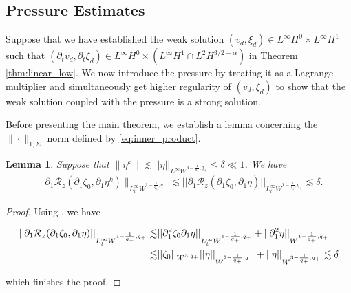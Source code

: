 \documentclass[letterpaper,reqno,10pt,twoside]{amsart}
\newtheorem{lemma}[theorem]{Lemma}
\theoremstyle{definition}
\theoremstyle{remark}
\def\p{\partial}
\begin{document}
	
	\subsection{Pressure Estimates}
	
	
	Suppose that we have established the weak solution $(v_{d}, \xi_{d}) \in L^\infty H^0 \times L^\infty H^1$ such that $(\p_tv_{d}, \p_t\xi_{d}) \in L^\infty H^0 \times \left( L^\infty H^1 \cap L^2H^{3/2-\alpha} \right)$ in Theorem \ref{thm:linear_low}. We now introduce the pressure by treating it as a Lagrange multiplier and simultaneously get higher regularity of $(v_{d}, \xi_{d})$ to show that the weak solution coupled with the pressure is a strong solution.
	
	Before presenting the main theorem, we establish a lemma concerning the $\|\cdot\|_{1,\Sigma}$ norm defined by \eqref{eq:inner_product}. 
	
	\begin{lemma}{\label{lem:lemma1}}
		Suppose that $\|\eta^{k}\|\lesssim\vert \vert \eta\vert \vert_{L^{\infty}W^{3-\frac{1}{q_{+}},q_{+}}}\leq \delta\ll1$. We have 
		\begin{align}
			\|\p_{1}\mathcal{R}_{z}(\p_{1}\zeta_{0},\p_{1}\eta^{k})\|_{L_{t}^{\infty}W^{1-\frac{1}{q_{+}},q_{+}}}\lesssim\vert \vert \partial_{1}\mathcal{R}_{z}(\partial_{1}\zeta_{0},\partial_{1}\eta)\vert \vert_{L_{t}^{\infty}W^{1-\frac{1}{q_{+}},q_{+}}}\lesssim \delta.
		\end{align}
	\end{lemma}
	
	\begin{proof}
		
		Using \cite[Theorem A.1]{GT2020}, we have
		
		\[
		\begin{aligned}
			\vert \vert \partial_{1}\mathcal{R}_{z}(\partial_{1}\zeta_{0},\partial_{1}\eta)\vert \vert_{L_{t}^{\infty}W^{1-\frac{1}{q_{+}},q_{+}}}\lesssim& \vert\vert \partial_{1}^{2}\zeta_{0}\partial_{1}\eta\vert\vert_{L_{t}^{\infty}W^{1-\frac{1}{q_{+}},q_{+}}}+\vert \vert \partial_{1}^{2}\eta\vert \vert_{W^{1-\frac{1}{q_{+}},q_{+}}}\notag\\\lesssim& \vert \vert \zeta_{0}\vert \vert_{W^{3,q_{+}}}\vert \vert \eta\vert \vert_{W^{2-\frac{1}{q_{+}},q_{+}}}+\vert \vert \eta \vert \vert_{W^{3-\frac{1}{q_{+}},q_{+}}}\lesssim \delta
		\end{aligned}
		\]
		
		\noindent which finishes the proof.
	\end{proof}
	
\end{document}
